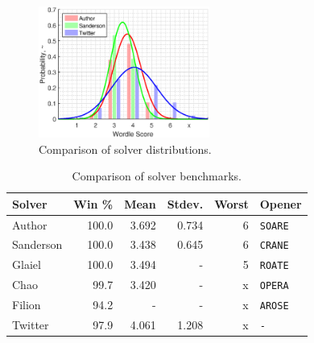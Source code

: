 \documentclass[twocolumn]{tudelft-aiaa}
\begin{document}
\begin{figure}[h!]
  \centering
    \includegraphics[width=0.5\textwidth]{performance_comparison.eps}
  \caption{Comparison of solver distributions.}
\label{performance_comparison}
\end{figure}

\begin{table}[h!]
\begin{centering}
\setlength\tabcolsep{3pt} %
\begin{tabular}{l | r | r | r | r | l}
\bf Solver & \bf Win \% & \bf Mean & \bf Stdev. & \bf Worst & \bf Opener\\
\hline \hline
Author\cite{Dichter} & 100.0 & 3.692 & 0.734 & 6 & \texttt{SOARE}\\ \hline
Sanderson\cite{Sanderson} & 100.0 & 3.438 & 0.645 & 6 & \texttt{CRANE}\\
Glaiel\cite{Glaiel} & 100.0 & 3.494 & - & 5 & \texttt{ROATE}\\
Chao\cite{Chao} & 99.7 & 3.420 & - & x & \texttt{OPERA}\\
Filion\cite{Filion} & 94.2 & - & - & x & \texttt{AROSE}\\
Twitter\cite{WordleStats} & 97.9 & 4.061 & 1.208 & x & \texttt{-}\\
\end{tabular}
\vspace{2 mm}
\caption{Comparison of solver benchmarks.}
\label{other_solvers}
\end{centering}
\end{table}


\end{document}
